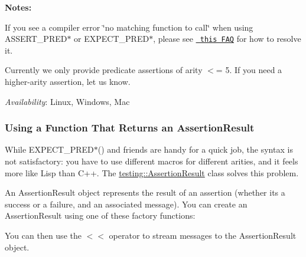 {\bfseries{Notes\+:}}


\begin{DoxyEnumerate}
\item If you see a compiler error \char`\"{}no matching function to call\char`\"{} when using {\ttfamily A\+S\+S\+E\+R\+T\+\_\+\+P\+R\+E\+D$\ast$} or {\ttfamily E\+X\+P\+E\+C\+T\+\_\+\+P\+R\+E\+D$\ast$}, please see \href{FAQ.md#the-compiler-complains-no-matching-function-to-call-when-i-use-assert_predn-how-do-i-fix-it}\texttt{ this F\+AQ} for how to resolve it.
\end{DoxyEnumerate}
\begin{DoxyEnumerate}
\item Currently we only provide predicate assertions of arity $<$= 5. If you need a higher-\/arity assertion, let us know.
\end{DoxyEnumerate}

{\itshape Availability}\+: Linux, Windows, Mac

\subsubsection*{Using a Function That Returns an Assertion\+Result}

While {\ttfamily E\+X\+P\+E\+C\+T\+\_\+\+P\+R\+E\+D$\ast$()} and friends are handy for a quick job, the syntax is not satisfactory\+: you have to use different macros for different arities, and it feels more like Lisp than C++. The {\ttfamily \mbox{\hyperlink{classtesting_1_1_assertion_result}{testing\+::\+Assertion\+Result}}} class solves this problem.

An {\ttfamily Assertion\+Result} object represents the result of an assertion (whether it\textquotesingle{}s a success or a failure, and an associated message). You can create an {\ttfamily Assertion\+Result} using one of these factory functions\+:


\begin{DoxyCode}{0}
\DoxyCodeLine{}
\DoxyCodeLine{}
\DoxyCodeLine{}
\DoxyCodeLine{\}}
\end{DoxyCode}


You can then use the {\ttfamily $<$$<$} operator to stream messages to the {\ttfamily Assertion\+Result} object.

